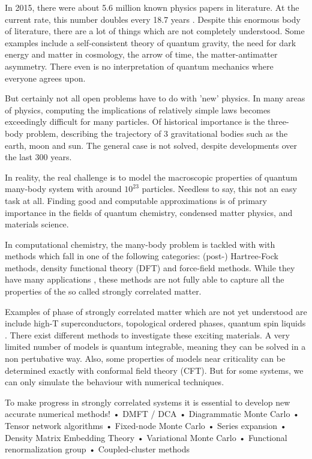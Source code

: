 
In 2015, there were about 5.6 million known physics papers in literature. At the current rate, this number doubles every 18.7 years \cite{Sinatra2015}. Despite this enormous body of literature, there are a lot of things which are not completely understood. Some examples include a self-consistent theory of quantum gravity, the need for dark energy and matter in cosmology, the arrow of time, the matter-antimatter asymmetry. There even is no interpretation of quantum mechanics where everyone agrees upon.

But certainly not all open problems have to do with 'new' physics. In many areas of physics, computing the implications of relatively simple laws becomes exceedingly difficult for many particles. Of historical importance is the three-body problem, describing the trajectory of 3 gravitational bodies such as the earth, moon and sun. The general case is not solved, despite developments over the last 300 years.

In reality, the real challenge is to model the macroscopic properties of quantum many-body system with around $10^{23}$ particles. Needless to say, this not an easy task at all. Finding good and computable approximations is of primary importance in the fields of quantum chemistry, condensed matter physics, and materials science.

In computational chemistry, the many-body problem is tackled with with methods which fall in one of the following categories: (post-) Hartree-Fock methods, density functional theory (DFT) and force-field methods. While they have many applications , these methods are not fully able to capture all the properties of the so called strongly correlated matter.

Examples of phase of strongly correlated matter which are not yet understood are include high-T superconductors, topological ordered phases, quantum spin liquids \cite{Orus2014}. There exist different methods to investigate these exciting materials. A very limited number of models is quantum integrable, meaning they can be solved in a non pertubative way. Also, some properties of models near criticality can be determined exactly with conformal field theory (CFT). But for some systems, we can only simulate the behaviour with numerical techniques.


To make progress in
strongly correlated
systems it is essential to
develop new accurate
numerical methods!
• DMFT / DCA
• Diagrammatic Monte Carlo
• Tensor network algorithms
• Fixed-node Monte Carlo
• Series expansion
• Density Matrix Embedding Theory
• Variational Monte Carlo
• Functional renormalization group
• Coupled-cluster methods

%